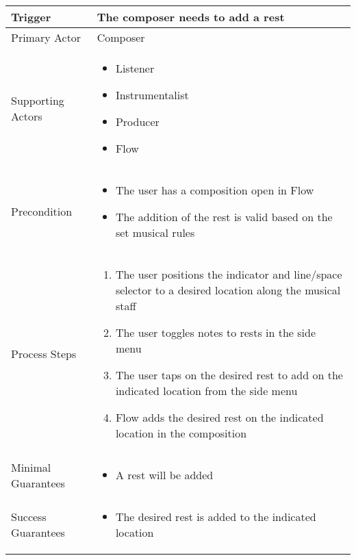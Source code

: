 \begin{longtable}{|X|X|}
\hline
Trigger &
The composer needs to add a rest \\
\hline
Primary Actor &
Composer \\
\hline
Supporting Actors & 
\begin{itemize}
\item Listener
\item Instrumentalist
\item Producer
\item Flow
\end{itemize} \\
\hline
Precondition & 
\begin{itemize}
\item The user has a composition open in Flow
\item The addition of the rest is valid based on the set musical rules
\end{itemize} \\
\hline
Process Steps & 
\begin{enumerate}
\item The user positions the indicator and line/space selector to a desired location along the musical staff
\item The user toggles notes to rests in the side menu
\item The user taps on the desired rest to add on the indicated location from the side menu
\item Flow adds the desired rest on the indicated location in the composition
\end{enumerate} \\
\hline
Minimal Guarantees & 
\begin{itemize}
  \item A rest will be added
\end{itemize} \\
\hline
Success Guarantees & 
\begin{itemize}
  \item The desired rest is added to the indicated location
\end{itemize} \\
\hline
\end{longtable}